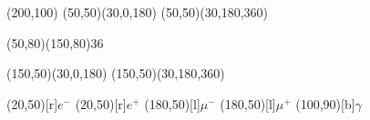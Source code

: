 \documentclass{article}
\begin{document}
\begin{center}
  \begin{axopicture}(200,100)
    \ArrowArc(50,50)(30,0,180)  %
    \ArrowArc(50,50)(30,180,360) %
    
    \Photon(50,80)(150,80){3}{6} %
    
    \ArrowArc(150,50)(30,0,180)  %
    \ArrowArc(150,50)(30,180,360) %
    
    \Text(20,50)[r]{\(e^-\)}     %
    \Text(20,50)[r]{\(e^+\)}     %
    \Text(180,50)[l]{\(\mu^-\)}  %
    \Text(180,50)[l]{\(\mu^+\)}  %
    \Text(100,90)[b]{\(\gamma\)} %
  \end{axopicture}
\end{center}
\end{document}
